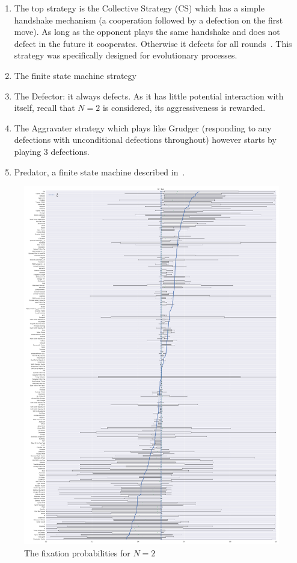 \documentclass{article}
\begin{document}
\begin{enumerate}
    \item The top strategy is the Collective Strategy (CS) which has a simple
        handshake mechanism (a cooperation followed by a defection on the first
        move). As long as the opponent plays the same handshake and does not
        defect in the future it cooperates. Otherwise it defects for all
        rounds~\cite{Li2009}. This strategy was specifically designed for
        evolutionary processes.
    \item The finite state machine strategy %
    \item The Defector: it always defects. As it has little potential
        interaction with itself, recall that \(N=2\) is considered, its
        aggressiveness is rewarded.
    \item The Aggravater strategy which plays like Grudger (responding to any
        defections with unconditional defections throughout) however starts by
        playing 3 defections.
    \item Predator, a finite state machine described in~\cite{Ashlock2006}.
\end{enumerate}


\begin{figure}[!hbtp]
    \centering
    \includegraphics[height=.8\textheight]{./img/boxplot_2_invade.pdf}
    \caption{The fixation probabilities for \(N=2\)}
    \label{fig:boxplot_2}
\end{figure}
\end{document}

